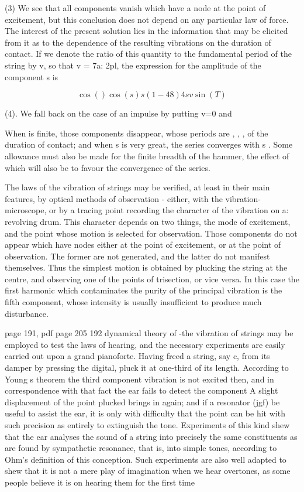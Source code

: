 (3) We see that all components vanish which have a node at the point of excitement,
but this conclusion does not depend on any particular law of force. The
interest of the present solution lies in the information that may be elicited
from it as to the dependence of the resulting vibrations on the duration of
contact. If we denote the ratio of this quantity to the fundamental period of
the string by v, so that v = 7a: 2pl, the expression for the amplitude of the
component s is

\[\cos() \cos(s) s (1 - 48 ) 4s v  \sin(T)\]

(4). We fall back on the case of an impulse by putting v=0 and

When is finite, those components disappear, whose periods are , , , of the
duration of contact; and when s is very great, the series converges with s .
Some allowance must also be made for the finite breadth of the hammer, the
effect of which will also be to favour the convergence of the series.

The laws of the vibration of strings may be verified, at least in their main
features, by optical methods of observation - either, with the
vibration-microscope, or by a tracing point recording the character of the
vibration on a: revolving drum. This character depends on two things, the mode
of excitement, and the point whose motion is selected for observation. Those
components do not appear which have nodes either at the point of excitement, or
at the point of observation. The former are not generated, and the latter do
not manifest themselves. Thus the simplest motion is obtained by plucking the
string at the centre, and observing one of the points of trisection, or vice
versa. In this case the first harmonic which contaminates the purity of the
principal vibration is the fifth component, whose intensity is usually
insufficient to produce much disturbance.

page 191, pdf page 205 192
dynamical theory of -the vibration of strings may be employed to test the laws
of hearing, and the necessary experiments are easily carried out upon a grand
pianoforte. Having freed a string, say c, from its damper by pressing the
digital, pluck it at one-third of its length. According to Young s theorem the
third component vibration is not excited then, and in correspondence with that
fact the ear fails to detect the component A slight displacement of the point
plucked brings in again; and if a resonator (jgf) be useful to assist the ear,
it is only with difficulty that the point can be hit with such precision as
entirely to extinguish the tone. Experiments of this kind shew that the ear
analyses the sound of a string into precisely the same constituents as are
found by sympathetic resonance, that is, into simple tones, according to Ohm’s
definition of this conception.  Such experiments are also well adapted to shew
that it is not a mere play of imagination when we hear overtones, as some
people believe it is on hearing them for the first time

